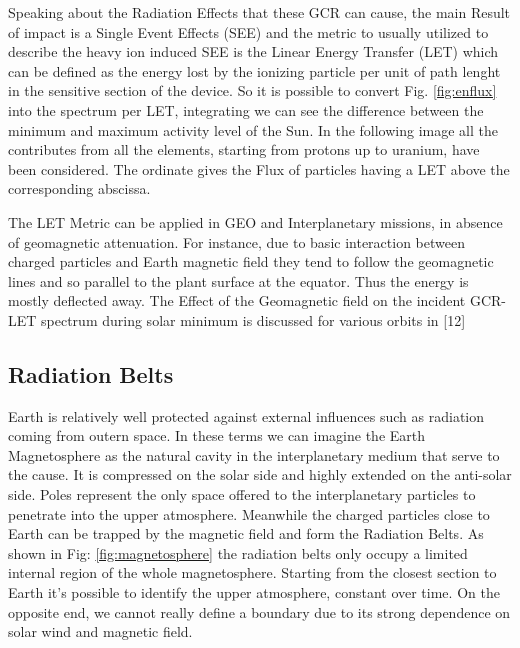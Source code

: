\documentclass[./dissertation.tex]{subfiles}
\begin{document}
Speaking about the Radiation Effects that these GCR can cause, the main Result of impact is a Single Event Effects (SEE) and the metric to usually utilized to describe the heavy ion induced SEE is the Linear Energy Transfer (LET) which can be defined as the energy lost by the ionizing particle per unit of path lenght in the sensitive section of the device. So it is possible to convert Fig. \ref{fig:enflux} into the spectrum per LET, integrating we can see the difference between the minimum and maximum activity level of the Sun. In the following image all the contributes from all the elements, starting from protons up to uranium, have been considered. The ordinate gives the Flux of particles having a LET above the corresponding abscissa. 

The LET Metric can be applied in GEO and Interplanetary missions, in absence of geomagnetic attenuation. For instance, due to basic interaction between charged particles and Earth magnetic field they tend to follow the geomagnetic lines and so parallel to the plant surface at the equator. Thus the energy is mostly deflected away. The Effect of the Geomagnetic field on the incident GCR-LET spectrum during solar minimum is discussed for various orbits in [12]


\subsection{Radiation Belts}
Earth is relatively well protected against external influences such as radiation coming from outern space. In these terms we can imagine the Earth Magnetosphere as the natural cavity in the interplanetary medium that serve to the cause. It is compressed on the solar side and highly extended on the anti-solar side. Poles represent the only space offered to the interplanetary particles to penetrate into the upper atmosphere. Meanwhile the charged particles close to Earth can be trapped by the magnetic field and form the Radiation Belts. As shown in Fig: \ref{fig:magnetosphere} the radiation belts only occupy a limited internal region of the whole magnetosphere. Starting from the closest section to Earth it's possible to identify the upper atmosphere, constant over time. On the opposite end, we cannot really define a boundary due to its strong dependence on solar wind and magnetic field.
\end{document}
